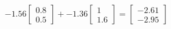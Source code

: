 \documentclass[preview]{standalone}
\begin{document}
\begin{align*}
-1.56 \begin{bmatrix} 0.8 \\ 0.5 \end{bmatrix} + -1.36 \begin{bmatrix} 1 \\ 1.6 \end{bmatrix} = \begin{bmatrix} -2.61 \\ -2.95 \end{bmatrix}
\end{align*}
\end{document}
